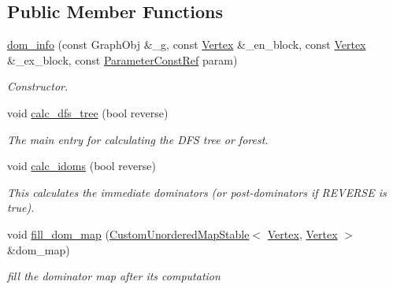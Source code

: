 \subsection*{Public Member Functions}
\begin{DoxyCompactItemize}
\item 
\hyperlink{classdom__info_af39638224cc10b17814aecb65453d49c}{dom\+\_\+info} (const Graph\+Obj \&\+\_\+g, const \hyperlink{classdom__info_a5e4ca21e2c5281bdbb95d2c8d965c9be}{Vertex} \&\+\_\+en\+\_\+block, const \hyperlink{classdom__info_a5e4ca21e2c5281bdbb95d2c8d965c9be}{Vertex} \&\+\_\+ex\+\_\+block, const \hyperlink{Parameter_8hpp_a37841774a6fcb479b597fdf8955eb4ea}{Parameter\+Const\+Ref} param)
\begin{DoxyCompactList}\small\item\em Constructor. \end{DoxyCompactList}\item 
void \hyperlink{classdom__info_aacc461d94e7bf7cc2e3b3994a42958ae}{calc\+\_\+dfs\+\_\+tree} (bool reverse)
\begin{DoxyCompactList}\small\item\em The main entry for calculating the D\+FS tree or forest. \end{DoxyCompactList}\item 
void \hyperlink{classdom__info_a814bd35f207ecedcb14aee48eb548d32}{calc\+\_\+idoms} (bool reverse)
\begin{DoxyCompactList}\small\item\em This calculates the immediate dominators (or post-\/dominators if R\+E\+V\+E\+R\+SE is true). \end{DoxyCompactList}\item 
void \hyperlink{classdom__info_af9e42db7ab94585f85b213682e4e95f7}{fill\+\_\+dom\+\_\+map} (\hyperlink{custom__map_8hpp_a7314a7df1cdb3a3acf478ab86e95c226}{Custom\+Unordered\+Map\+Stable}$<$ \hyperlink{classdom__info_a5e4ca21e2c5281bdbb95d2c8d965c9be}{Vertex}, \hyperlink{classdom__info_a5e4ca21e2c5281bdbb95d2c8d965c9be}{Vertex} $>$ \&dom\+\_\+map)
\begin{DoxyCompactList}\small\item\em fill the dominator map after its computation \end{DoxyCompactList}\end{DoxyCompactItemize}

